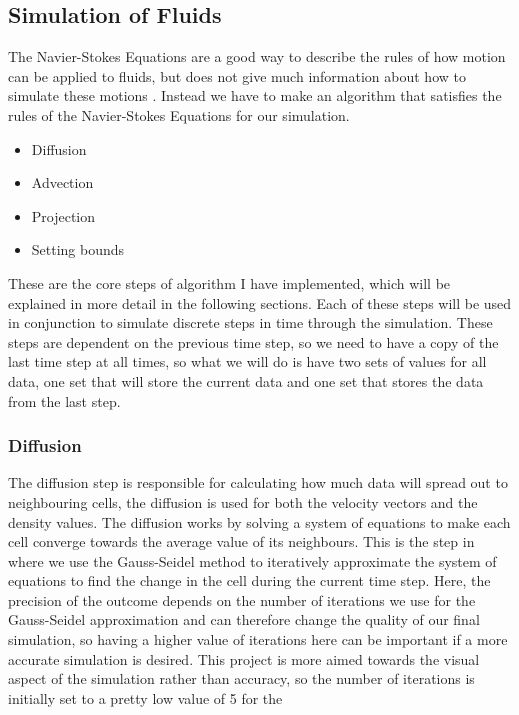 \documentclass{article}
\begin{document}
\begin{multicols}{2}
\subsection{Simulation of Fluids}
The Navier-Stokes Equations are a good way to describe the rules of how motion can be applied to fluids, but does not give much information about how to simulate these motions \cite{inspecto}. Instead we have to make an algorithm that satisfies the rules of the Navier-Stokes Equations for our simulation.
\begin{itemize}
    \item Diffusion
    \item Advection
    \item Projection
    \item Setting bounds
\end{itemize}
These are the core steps of algorithm I have implemented, which will be explained in more detail in the following sections. Each of these steps will be used in conjunction to simulate discrete steps in time through the simulation. These steps are dependent on the previous time step, so we need to have a copy of the last time step at all times, so what we will do is have two sets of values for all data, one set that will store the current data and one set that stores the data from the last step.

\subsubsection{Diffusion}
The diffusion step is responsible for calculating how much data will spread out to neighbouring cells, the diffusion is used for both the velocity vectors and the density values. The diffusion works by solving a system of equations to make each cell converge towards the average value of its neighbours. This is the step in where we use the Gauss-Seidel method to iteratively approximate the system of equations to find the change in the cell during the current time step. Here, the precision of the outcome depends on the number of iterations we use for the Gauss-Seidel approximation and can therefore change the quality of our final simulation, so having a higher value of iterations here can be important if a more accurate simulation is desired. This project is more aimed towards the visual aspect of the simulation rather than accuracy, so the number of iterations is initially set to a pretty low value of 5 for the%
%
\end{multicols}%
\end{document}
